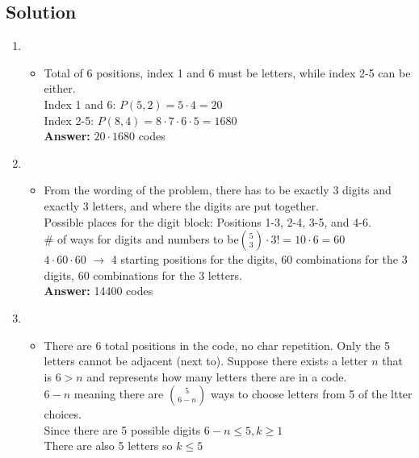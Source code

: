 \documentclass[11pt]{article}
\begin{document}
    \subsection*{Solution}
    \begin{enumerate}[label=(\alph*)]
        \item
        \begin{itemize}
            \item[] Total of 6 positions, index 1 and 6 must be letters, while index 2-5 can be either. \\
            Index 1 and 6: \(P(5,2) = 5 \cdot 4 = 20\) \\
            Index 2-5: \(P(8,4)= 8 \cdot7\cdot6\cdot5=1680\) \\
            \textbf{Answer:} \(20 \cdot 1680\) codes
        \end{itemize}
        \item
        \begin{itemize}
            \item[] From the wording of the problem, there has to be exactly 3 digits and exactly 3 letters, and where the digits are put together. \\
            Possible places for the digit block: Positions 1-3, 2-4, 3-5, and 4-6. \\
            \# of ways for digits and numbers to be\(\binom{5}{3} \cdot 3! = 10 \cdot 6 = 60\) \\
            \(4 \cdot 60 \cdot 60\) \(\rightarrow\) 4 starting positions for the digits, 60 combinations for the 3 digits, 60 combinations for the 3 letters. \\
            \textbf{Answer:} 14400 codes \\
        \end{itemize}
        \item
        \begin{itemize}
            \item[] There are 6 total positions in the code, no char repetition. Only the 5 letters cannot be adjacent (next to). Suppose there exists a letter \(n\) that is \(6 > n\) and represents how many letters there are in a code. \\
            \(6-n\) meaning there are \(\binom{5}{6-n}\) ways to choose letters from 5 of the ltter choices. \\
            Since there are 5 possible digits \(6-n \leq 5, k \geq1\) \\
            There are also 5 letters so \(k \leq 5\)

\end{itemize}
\end{enumerate}
\end{document}
